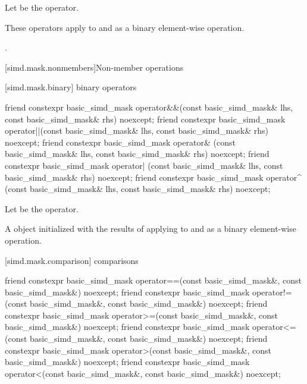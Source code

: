 \begin{itemdescr}
  \pnum Let \op{} be the operator.

  \pnum\effects
  These operators apply \op{} to  and  as a binary
  element-wise operation.

  \pnum\returns
  .
\end{itemdescr}

[simd.mask.nonmembers]{Non-member operations}

[simd.mask.binary]{ binary operators}

\begin{itemdecl}
friend constexpr basic_simd_mask
  operator&&(const basic_simd_mask& lhs, const basic_simd_mask& rhs) noexcept;
friend constexpr basic_simd_mask
  operator||(const basic_simd_mask& lhs, const basic_simd_mask& rhs) noexcept;
friend constexpr basic_simd_mask
  operator& (const basic_simd_mask& lhs, const basic_simd_mask& rhs) noexcept;
friend constexpr basic_simd_mask
  operator| (const basic_simd_mask& lhs, const basic_simd_mask& rhs) noexcept;
friend constexpr basic_simd_mask
  operator^ (const basic_simd_mask& lhs, const basic_simd_mask& rhs) noexcept;
\end{itemdecl}

\begin{itemdescr}
  \pnum Let \op{} be the operator.

  \pnum\returns
  A  object initialized with the results of applying \op{}
  to  and  as a binary element-wise operation.
\end{itemdescr}

[simd.mask.comparison]{ comparisons}

\begin{itemdecl}
friend constexpr basic_simd_mask
  operator==(const basic_simd_mask&, const basic_simd_mask&) noexcept;
friend constexpr basic_simd_mask
  operator!=(const basic_simd_mask&, const basic_simd_mask&) noexcept;
friend constexpr basic_simd_mask
  operator>=(const basic_simd_mask&, const basic_simd_mask&) noexcept;
friend constexpr basic_simd_mask
  operator<=(const basic_simd_mask&, const basic_simd_mask&) noexcept;
friend constexpr basic_simd_mask
  operator>(const basic_simd_mask&, const basic_simd_mask&) noexcept;
friend constexpr basic_simd_mask
  operator<(const basic_simd_mask&, const basic_simd_mask&) noexcept;
\end{itemdecl}


